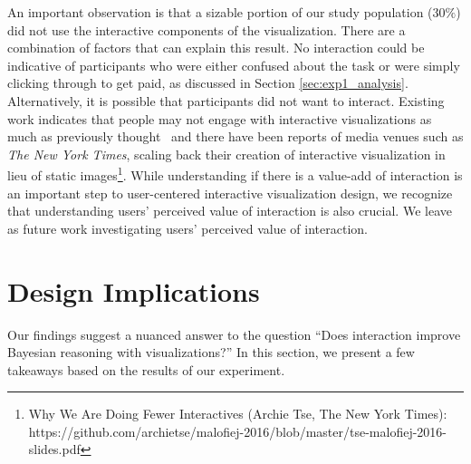 An important observation is that a sizable portion of our study population ($30\%$) did not use the interactive components of the visualization. There are a combination of factors that can explain this result. %
No interaction could be indicative of participants who were either confused about the task or were simply clicking through to get paid, as discussed in Section \ref{sec:exp1_analysis}. 
Alternatively, it is possible that participants did not want to interact. Existing work indicates that people may not engage with interactive visualizations as much as previously thought~\cite{boy2015storytelling} and there have been reports of media venues such as \textit{The New York Times}, scaling back their creation of interactive visualization in lieu of static images\footnote{\label{foot:nyt}Why We Are Doing Fewer Interactives (Archie Tse, The New York Times): https://github.com/archietse/malofiej-2016/blob/master/tse-malofiej-2016-slides.pdf}.
While understanding if there is a value-add of interaction is an important step to user-centered interactive visualization design, we recognize that understanding users' perceived value of interaction is also crucial. We leave as future work investigating users' perceived value of interaction.  %

\section{Design Implications} 
Our findings suggest a nuanced answer to the question ``Does interaction improve Bayesian reasoning with visualizations?'' In this section, we present a few takeaways based on the results of our experiment.

